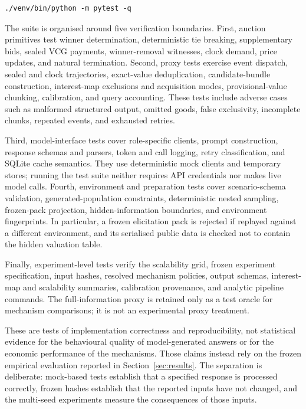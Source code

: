 \begin{verbatim}
./venv/bin/python -m pytest -q
\end{verbatim}

The suite is organised around five verification boundaries. First, auction
primitives test winner determination, deterministic tie breaking, supplementary
bids, sealed VCG payments, winner-removal witnesses, clock demand, price
updates, and natural termination. Second, proxy tests exercise event dispatch,
sealed and clock trajectories, exact-value deduplication, candidate-bundle
construction, interest-map exclusions and acquisition modes, provisional-value
chunking, calibration, and query accounting. These tests include adverse cases
such as malformed structured output, omitted goods, false exclusivity,
incomplete chunks, repeated events, and exhausted retries.

Third, model-interface tests cover role-specific clients, prompt construction,
response schemas and parsers, token and call logging, retry classification, and
SQLite cache semantics. They use deterministic mock clients and temporary
stores; running the test suite neither requires API credentials nor makes live
model calls. Fourth, environment and preparation tests cover scenario-schema
validation, generated-population constraints, deterministic nested sampling,
frozen-pack projection, hidden-information boundaries, and environment
fingerprints. In particular, a frozen elicitation pack is rejected if replayed
against a different environment, and its serialised public data is checked not
to contain the hidden valuation table.

Finally, experiment-level tests verify the scalability grid, frozen experiment
specification, input hashes, resolved mechanism policies, output schemas,
interest-map and scalability summaries, calibration provenance, and analytic
pipeline commands. The full-information proxy is retained only as a test oracle
for mechanism comparisons; it is not an experimental proxy treatment.

These are tests of implementation correctness and reproducibility, not
statistical evidence for the behavioural quality of model-generated answers or
for the economic performance of the mechanisms. Those claims instead rely on
the frozen empirical evaluation reported in Section~\ref{sec:results}. The
separation is deliberate: mock-based tests establish that a specified response
is processed correctly, frozen hashes establish that the reported inputs have
not changed, and the multi-seed experiments measure the consequences of those
inputs.





